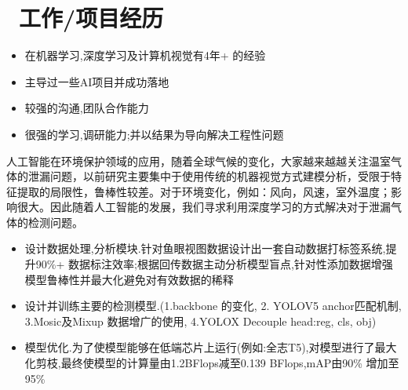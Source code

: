 \documentclass{resume}
\begin{document}



\section{\faUsers\ 工作/项目经历}
\role{Research Assistant}



\begin{itemize}
  \item 在机器学习,深度学习及计算机视觉有4年+ 的经验
  \item 主导过一些AI项目并成功落地
  \item 较强的沟通,团队合作能力
  \item 很强的学习,调研能力;并以结果为导向解决工程性问题
\end{itemize}

\begin{onehalfspacing}
人工智能在环境保护领域的应用，随着全球气候的变化，大家越来越越关注温室气体的泄漏问题，以前研究主要集中于使用传统的机器视觉方式建模分析，受限于特征提取的局限性，鲁棒性较差。对于环境变化，例如：风向，风速，室外温度；影响很大。因此随着人工智能的发展，我们寻求利用深度学习的方式解决对于泄漏气体的检测问题。


\begin{itemize}
  \item 设计数据处理,分析模块.针对鱼眼视图数据设计出一套自动数据打标签系统,提升90\%+ 数据标注效率;根据回传数据主动分析模型盲点,针对性添加数据增强模型鲁棒性并最大化避免对有效数据的稀释
  \item 设计并训练主要的检测模型.(1.backbone 的变化, 2. YOLOV5 anchor匹配机制, 3.Mosic及Mixup 数据增广的使用, 4.YOLOX Decouple head:reg, cls, obj)
  \item 模型优化.为了使模型能够在低端芯片上运行(例如:全志T5),对模型进行了最大化剪枝,最终使模型的计算量由1.2BFlops减至0.139 BFlops,mAP由90\% 增加至 95\%
\end{itemize}
\end{onehalfspacing}
\end{document}
